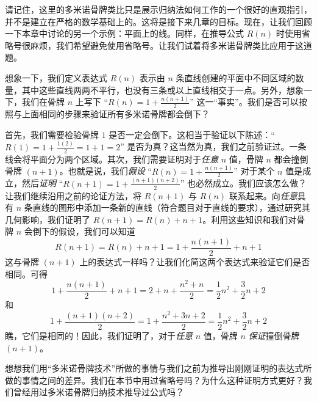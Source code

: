 请记住，这里的多米诺骨牌类比只是展示归纳法如何工作的一个很好的直观指引，并不是建立在严格的数学基础上的。这将是接下来几章的目标。现在，让我们回顾一下本章中讨论的另一个示例：平面上的线。同样，在推导公式 $R(n)$ 时使用省略号很麻烦，我们希望避免使用省略号。让我们试着将多米诺骨牌类比应用于这道题。

想象一下，我们定义表达式 $R(n)$ 表示由 $n$ 条直线创建的平面中不同区域的数量，其中这些直线两两不平行，也没有三条或以上直线相交于一点。另外，想象一下，我们在骨牌 $n$ 上写下 ``$R(n) = 1 + \frac{n(n+1)}{2}$'' 这一``事实''。我们是否可以按照与上面相同的步骤来验证所有多米诺骨牌都会倒下？

首先，我们需要检验骨牌 $1$ 是否一定会倒下。这相当于验证以下陈述：``$R(1) = 1+\frac{1(2)}{2} = 1+1 = 2$'' 是否为真？这当然为真，我们之前验证过。一条线会将平面分为两个区域。其次，我们需要证明对于\emph{任意} $n$ 值，骨牌 $n$ 都会撞倒骨牌 $(n + 1)$。也就是说，我们\emph{假设} ``$R(n) = 1 + \frac{n(n+1)}{2}$'' 对于某个 $n$ 值是成立，然后\emph{证明} ``$R(n + 1) = 1 + \frac{(n+1)(n +2)}{2}$'' 也必然成立。我们应该怎么做？让我们继续沿用之前的论证方法，将 $R(n + 1)$ 与 $R(n)$ 联系起来。向\emph{任意}具有 $n$ 条直线的图形中添加一条新的直线（符合题目对于直线的要求），通过研究其几何影响，我们证明了 $R(n+ 1) = R(n) +n+ 1$。利用这些知识和我们对骨牌 $n$ 会倒下的假设，我们可以知道
\[R(n + 1) = R(n) + n + 1 = 1 +\frac{n(n+1)}{2}+ n + 1\]
这与骨牌 $(n + 1)$ 上的表达式一样吗？让我们化简这两个表达式来验证它们是否相同。可得
\[1 +\frac{n(n+1)}{2}+ n + 1=2+n+\frac{n^2+n}{2} = \frac{1}{2}n^2+\frac{3}{2}n+2\]
和
\[1 + \frac{(n+1)(n +2)}{2} = 1+\frac{n^2+3n+2}{2} =  \frac{1}{2}n^2+\frac{3}{2}n+2\]
瞧，它们是相同的！因此，我们证明了，对于\emph{任意} $n$ 值，骨牌 $n$ \emph{保证}撞倒骨牌 $(n+1)$。

想想我们用``多米诺骨牌技术''所做的事情与我们之前为推导出刚刚证明的表达式所做的事情之间的差异。我们在本节中用过省略号吗？为什么这种证明方式更好？我们曾经用过多米诺骨牌归纳技术推导过公式吗？
